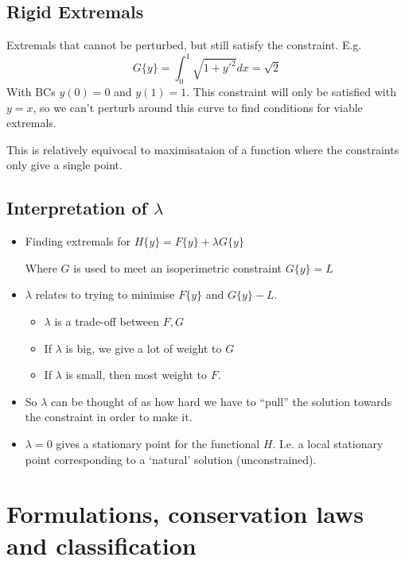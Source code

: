 \documentclass{X:/Documents/Coding/Latex/myassignment}
\begin{document}
\subsection{Rigid Extremals}
Extremals that cannot be perturbed, but still satisfy the constraint.
E.g.
\[G\{y\} = \int_0^1 \sqrt{1+y'^2} dx = \sqrt{2}\]
With BCs $y(0) = 0$ and $y(1) = 1$.
This constraint will only be satisfied with $y = x$, so we can't perturb around this curve to find conditions for viable extremals.

This is relatively equivocal to maximisataion of a function where the constraints only give a single point.



\subsection{Interpretation of $\lambda$}
\begin{itemize}
	\item Finding extremals for $H\{y\} = F\{y\} + \lambda G\{y\}$

	Where $G$ is used to meet an isoperimetric constraint $G\{y\} = L$
	\item $\lambda$ relates to trying to minimise $F\{y\}$ and $G\{y\} - L$.
	\begin{itemize}
		\item $\lambda$ is a trade-off between $F,G$
		\item If $\lambda$ is big, we give a lot of weight to $G$
		\item If $\lambda$ is small, then most weight to $F$.
	\end{itemize}
	\item So $\lambda$ can be thought of as how hard we have to ``pull'' the solution towards the constraint in order to make it.
	\item $\lambda = 0$ gives a stationary point for the functional $H$. I.e. a local stationary point corresponding to a `natural' solution (unconstrained).
\end{itemize}



\section{Formulations, conservation laws and classification}
\end{document}
